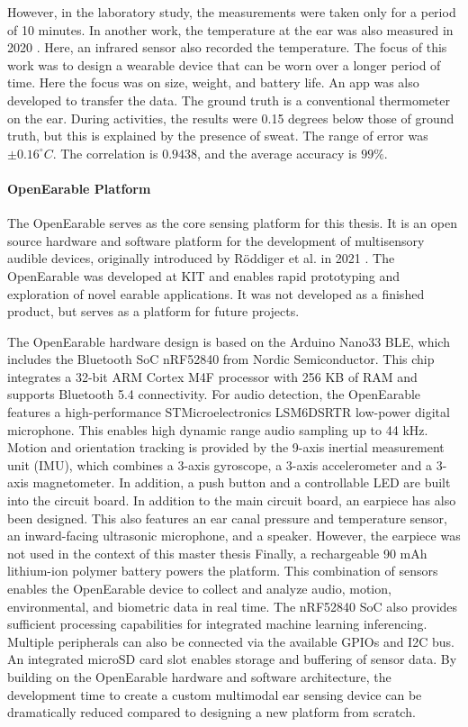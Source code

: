 However, in the laboratory study, the measurements were taken only for a period of 10 minutes.
In another work, the temperature at the ear was also measured in 2020 \cite{chenInearThermometerWearable2020}.
Here, an infrared sensor also recorded the temperature. 
The focus of this work was to design a wearable device that can be worn over a longer period of time. 
Here the focus was on size, weight, and battery life.
An app was also developed to transfer the data.
The ground truth is a conventional thermometer on the ear.
During activities, the results were 0.15 degrees below those of ground truth, but this is explained by the presence of sweat.
The range of error was $\pm 0.16 ^\circ C$.
The correlation is $0.9438$, and the average accuracy is $99\%$.

\paragraph{OpenEarable Platform}
\label{Background:SensingWithEarables:OpenEarable}
The OpenEarable serves as the core sensing platform for this thesis. 
It is an open source hardware and software platform for the development of multisensory audible devices, originally introduced by Röddiger et al. in 2021 \cite{roddigerOpenEarableOpenHardware2022}. 
The OpenEarable was developed at KIT and enables rapid prototyping and exploration of novel earable applications. 
It was not developed as a finished product, but serves as a platform for future projects.

The OpenEarable hardware design is based on the Arduino Nano33 BLE, which includes the Bluetooth SoC nRF52840 from Nordic Semiconductor.
This chip integrates a 32-bit ARM Cortex M4F processor with 256 KB of RAM and supports Bluetooth 5.4 connectivity. 
For audio detection, the OpenEarable features a high-performance STMicroelectronics LSM6DSRTR low-power digital microphone. 
This enables high dynamic range audio sampling up to 44 kHz. 
Motion and orientation tracking is provided by the 9-axis inertial measurement unit (IMU), which combines a 3-axis gyroscope, a 3-axis accelerometer and a 3-axis magnetometer. 
In addition, a push button and a controllable LED are built into the circuit board.
In addition to the main circuit board, an earpiece has also been designed. 
This also features an ear canal pressure and temperature sensor, an inward-facing ultrasonic microphone, and a speaker.
However, the earpiece was not used in the context of this master thesis
Finally, a rechargeable 90 mAh lithium-ion polymer battery powers the platform.
This combination of sensors enables the OpenEarable device to collect and analyze audio, motion, environmental, and biometric data in real time. The nRF52840 SoC also provides sufficient processing capabilities for integrated machine learning inferencing. 
Multiple peripherals can also be connected via the available GPIOs and I2C bus. 
An integrated microSD card slot enables storage and buffering of sensor data.
By building on the OpenEarable hardware and software architecture, the development time to create a custom multimodal ear sensing device can be dramatically reduced compared to designing a new platform from scratch. 

